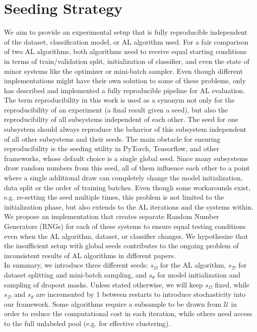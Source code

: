 \documentclass[]{article}
\begin{document}
\section{Seeding Strategy}\label{app:seeding_strategy}
We aim to provide an experimental setup that is fully reproducible independent of the dataset, classification model, or AL algorithm used.
For a fair comparison of two AL algorithms, both algorithms need to receive equal starting conditions in terms of train/validation split, initialization of classifier, and even the state of minor systems like the optimizer or mini-batch sampler.
Even though different implementations might have their own solution to some of these problems, only \cite{ji2023randomness} has described and implemented a fully reproducible pipeline for AL evaluation.
The term reproducibility in this work is used as a synonym not only for the reproducibility of an experiment (a final result given a seed), but also the reproducibility of all subsystems independent of each other.
The seed for one subsystem should always reproduce the behavior of this subsystem independent of all other subsystems and their seeds.
The main obstacle for ensuring reproducibility is the seeding utility in PyTorch, Tensorflow, and other frameworks, whose default choice is a single global seed.
Since many subsystems draw random numbers from this seed, all of them influence each other to a point where a single additional draw can completely change the model initialization, data split or the order of training batches.
Even though some workarounds exist, e.g. re-setting the seed multiple times, this problem is not limited to the initialization phase, but also extends to the AL iterations and the systems within.
We propose an implementation that creates separate Random Number Generators (RNGs) for each of these systems to ensure equal testing conditions even when the AL algorithm, dataset, or classifier changes.
We hypothesize that the insufficient setup with global seeds contributes to the ongoing problem of inconsistent results of AL algorithms in different papers. \\ [1mm]
In summary, we introduce three different seeds: $s_\Omega$ for the AL algorithm, $s_\mathcal{D}$ for dataset splitting and mini-batch sampling, and $s_\theta$ for model initialization and sampling of dropout masks.
Unless stated otherwise, we will keep $s_\Omega$ fixed, while $s_\mathcal{D}$ and $s_\theta$ are incremented by 1 between restarts to introduce stochasticity into our framework.
Some algorithms require a subsample to be drawn from $\mathcal{U}$ in order to reduce the computational cost in each iteration, while others need access to the full unlabeled pool (e.g. for effective clustering).
\end{document}
